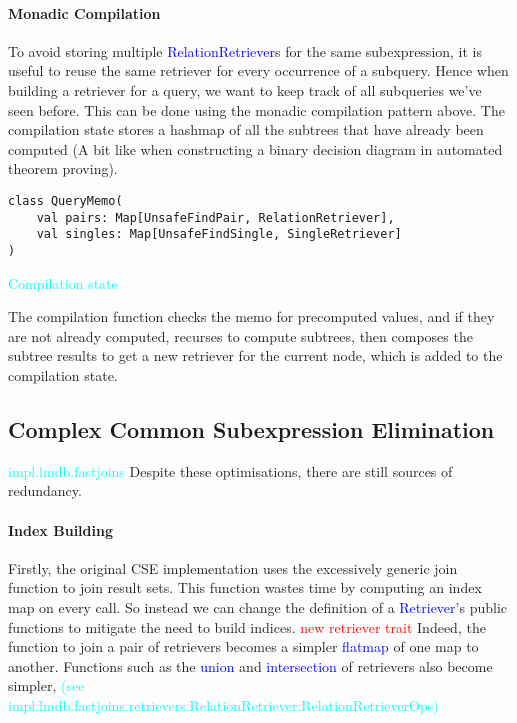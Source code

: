 \documentclass[12pt,a4paper,twoside,openright]{report}
\newcommand\todo[1]{\textcolor{red}{#1}}
\newcommand\codeName[1]{\textcolor{blue}{#1}}
\newcommand\note[1]{\textcolor{cyan}{#1}}
\begin{document}
{{		
		\paragraph{Monadic Compilation}
		To avoid storing multiple \codeName{RelationRetriever}s for the same subexpression, it is useful to reuse the same retriever for every occurrence of a subquery. Hence when building a retriever for a query, we want to keep track of all subqueries we've seen before. This can be done using the monadic compilation pattern above. The compilation state stores a hashmap of all the subtrees that have already been computed (A bit like when constructing a binary decision diagram in automated theorem proving). 
		
\begin{framed}
\begin{verbatim}
class QueryMemo(
    val pairs: Map[UnsafeFindPair, RelationRetriever], 
    val singles: Map[UnsafeFindSingle, SingleRetriever]
)
\end{verbatim}
\note{Compilation state}
\end{framed}
		The compilation function checks the memo for precomputed values, and if they are not already computed, recurses to compute subtrees, then composes the subtree results to get a new retriever for the current node, which is added to the compilation state.
		
	\subsection{Complex Common Subexpression Elimination}
	\note{impl.lmdb.fastjoins}
Despite these optimisations, there are still sources of redundancy.

		\paragraph{Index Building}
			Firstly, the original CSE implementation uses the excessively generic join function to join result sets. This function wastes time by computing an index map on every call. So instead we can change the definition of a \codeName{Retriever}'s public functions to mitigate the need to build indices.
			\todo{new retriever trait}
			Indeed, the function to join a pair of retrievers becomes a simpler \codeName{flatmap} of one map to another. Functions such as the \codeName{union} and \codeName{intersection} of retrievers also become simpler, \note{(see impl.lmdb.fastjoins.retrievers.RelationRetriever.RelationRetrieverOps)}

}}
\end{document}

